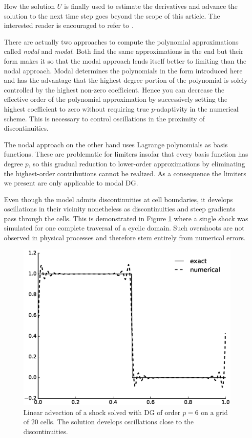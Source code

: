 How the solution $U$ is finally used to estimate the derivatives and advance the solution to the next time step goes beyond the scope of this article.
The interested reader is encouraged to refer to \cite[Chapter 3]{Hesthaven2007}.

There are actually two approaches to compute the polynomial approximations called \emph{nodal} and \emph{modal}.
Both find the same approximations in the end but their form makes it so that the modal approach lends itself better to limiting than the nodal approach.
Modal determines the polynomials in the form introduced here and has the advantage that the highest degree portion of the polynomial is solely controlled by the highest non-zero coefficient.
Hence you can decrease the effective order of the polynomial approximation by successively setting the highest coefficient to zero without requiring true $p$-adaptivity in the numerical scheme.
This is necessary to control oscillations in the proximity of discontinuities.

The nodal approach on the other hand uses Lagrange polynomials as basis functions.
These are problematic for limiters insofar that every basis function has degree $p$, so this gradual reduction to lower-order approximations by eliminating the highest-order contributions cannot be realized.
As a consequence the limiters we present are only applicable to modal DG.

Even though the model admits discontinuities at cell boundaries, it develops oscillations in their vicinity nonetheless as discontinuities and steep gradients pass through the cells.
This is demonstrated in Figure \ref{fig:dg-oscillations} where a single shock was simulated for one complete traversal of a cyclic domain.
Such overshoots are not observed in physical processes and therefore stem entirely from numerical errors.

\begin{figure}[h]
  \centering
  \includegraphics[width=0.8\columnwidth]{figures/oscillations}
  \caption{Linear advection of a shock solved with DG of order $p = 6$ on a grid of $20$ cells. The solution develops oscillations close to the discontinuities.}
  \label{fig:dg-oscillations}
\end{figure}
